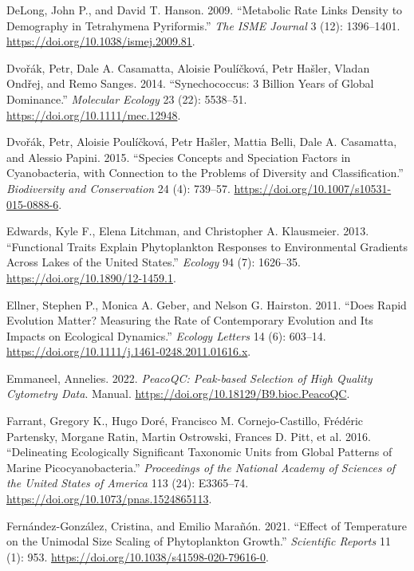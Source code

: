 \documentclass[
  letterpaper,
  DIV=11,
  numbers=noendperiod]{scrartcl}
\newlength{\cslhangindent}
\newenvironment{CSLReferences}[2] %
 {\begin{list}{}{%
  \setlength{\itemindent}{0pt}
  \setlength{\leftmargin}{0pt}
  \setlength{\parsep}{0pt}
  \ifodd #1
   \setlength{\leftmargin}{\cslhangindent}
   \setlength{\itemindent}{-1\cslhangindent}
  \fi
  \setlength{\itemsep}{#2\baselineskip}}}
 {\end{list}}
\begin{document}
\begin{CSLReferences}{1}{0}
DeLong, John P., and David T. Hanson. 2009. {``Metabolic Rate Links
Density to Demography in {Tetrahymena} Pyriformis.''} \emph{The ISME
Journal} 3 (12): 1396--1401.
\url{https://doi.org/10.1038/ismej.2009.81}.

Dvořák, Petr, Dale A. Casamatta, Aloisie Poulíčková, Petr Hašler, Vladan
Ondřej, and Remo Sanges. 2014. {``Synechococcus: 3 Billion Years of
Global Dominance.''} \emph{Molecular Ecology} 23 (22): 5538--51.
\url{https://doi.org/10.1111/mec.12948}.

Dvořák, Petr, Aloisie Poulíčková, Petr Hašler, Mattia Belli, Dale A.
Casamatta, and Alessio Papini. 2015. {``Species Concepts and Speciation
Factors in Cyanobacteria, with Connection to the Problems of Diversity
and Classification.''} \emph{Biodiversity and Conservation} 24 (4):
739--57. \url{https://doi.org/10.1007/s10531-015-0888-6}.

Edwards, Kyle F., Elena Litchman, and Christopher A. Klausmeier. 2013.
{``Functional Traits Explain Phytoplankton Responses to Environmental
Gradients Across Lakes of the {United States}.''} \emph{Ecology} 94 (7):
1626--35. \url{https://doi.org/10.1890/12-1459.1}.

Ellner, Stephen P., Monica A. Geber, and Nelson G. Hairston. 2011.
{``Does Rapid Evolution Matter? {Measuring} the Rate of Contemporary
Evolution and Its Impacts on Ecological Dynamics.''} \emph{Ecology
Letters} 14 (6): 603--14.
\url{https://doi.org/10.1111/j.1461-0248.2011.01616.x}.

Emmaneel, Annelies. 2022. \emph{{PeacoQC}: {Peak-based} Selection of
High Quality Cytometry Data}. Manual.
\url{https://doi.org/10.18129/B9.bioc.PeacoQC}.

Farrant, Gregory K., Hugo Doré, Francisco M. Cornejo-Castillo, Frédéric
Partensky, Morgane Ratin, Martin Ostrowski, Frances D. Pitt, et al.
2016. {``Delineating Ecologically Significant Taxonomic Units from
Global Patterns of Marine Picocyanobacteria.''} \emph{Proceedings of the
National Academy of Sciences of the United States of America} 113 (24):
E3365--74. \url{https://doi.org/10.1073/pnas.1524865113}.

Fernández-González, Cristina, and Emilio Marañón. 2021. {``Effect of
Temperature on the Unimodal Size Scaling of Phytoplankton Growth.''}
\emph{Scientific Reports} 11 (1): 953.
\url{https://doi.org/10.1038/s41598-020-79616-0}.


\end{CSLReferences}
\end{document}
